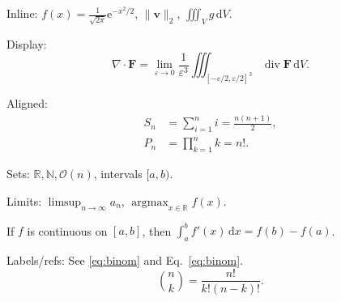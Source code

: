 \documentclass{article}
\newcommand{\vect}[1]{\mathbf{#1}}
\newcommand{\norm}[1]{\lVert #1 \rVert}
\DeclareMathOperator{\argmax}{argmax}
\begin{document}
Inline: $f(x)=\frac{1}{\sqrt{2\pi}}\mathrm{e}^{-x^2/2}$, $\norm{\vect{v}}_2$, $\iiint_V g\,\mathrm{d}V$.

Display:
\[
\nabla \cdot \vect{F}=\lim_{\varepsilon\to 0}\frac{1}{\varepsilon^3}
\iiint_{[-\varepsilon/2,\varepsilon/2]^3} \operatorname{div}\vect{F}\,\mathrm{d}V.
\]

Aligned:
\begin{align}
S_n &= \sum_{i=1}^n i = \frac{n(n+1)}{2}, \\
P_n &= \prod_{k=1}^n k = n!.
\end{align}

Sets: $\mathbb{R}, \mathbb{N}, \mathcal{O}(n)$, intervals $[a,b)$.

Limits: $\limsup_{n\to\infty} a_n$, $\argmax_{x\in\mathbb{R}} f(x)$.

\begin{theorem}
If $f$ is continuous on $[a,b]$, then $\int_a^b f'(x)\,\mathrm{d}x=f(b)-f(a)$.
\end{theorem}

Labels/refs: See \eqref{eq:binom} and Eq.~\ref{eq:binom}.
\begin{equation}\label{eq:binom}
\binom{n}{k}=\frac{n!}{k!(n-k)!}.
\end{equation}

\newcommand{\R}{\mathbb{R}}
\renewcommand{\vec}[1]{\underline{#1}}
\end{document}
